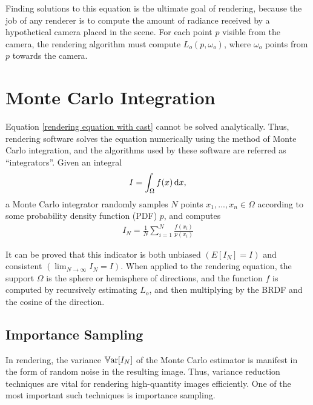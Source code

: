 Finding solutions to this equation is the ultimate goal of rendering, because the job of any renderer is to compute the amount of radiance received by a hypothetical camera placed in the scene. For each point $p$ visible from the camera, the rendering algorithm must compute $L_o(p,\omega_o)$, where $\omega_o$ points from $p$ towards the camera. 

\section{Monte Carlo Integration}

Equation \ref{rendering equation with cast} cannot be solved analytically. Thus, rendering software solves the equation numerically using the method of Monte Carlo integration, and the algorithms used by these software are referred as ``integrators''. Given an integral
\begin{align*}
    I = \int_\Omega f(x) \,\mathrm{d} x,
\end{align*}
a Monte Carlo integrator randomly samples $N$ points $x_1,...,x_n\in \Omega$ according to some probability density function (PDF) $p$, and computes
\begin{align}
    I_N = \frac{1}{N}\sum_{i=1}^{N} \frac{f(x_i)}{p(x_i)}
    \label{monte carlo estimator}
\end{align}

It can be proved that this indicator is both unbiased $(E[I_N]=I)$ and consistent $(\lim_{N\to\infty}I_N = I)$. When applied to the rendering equation, the support $\Omega$ is the sphere or hemisphere of directions, and the function $f$ is computed by recursively estimating $L_o$, and then multiplying by the BRDF and the cosine of the direction.

\subsection{Importance Sampling}
\label{subsection IS}
In rendering, the variance $\mathbb{V}\text{ar}[I_N]$ of the Monte Carlo estimator is manifest in the form of random noise in the resulting image. Thus, variance reduction techniques are vital for rendering high-quantity images efficiently. One of the most important such techniques is importance sampling.

